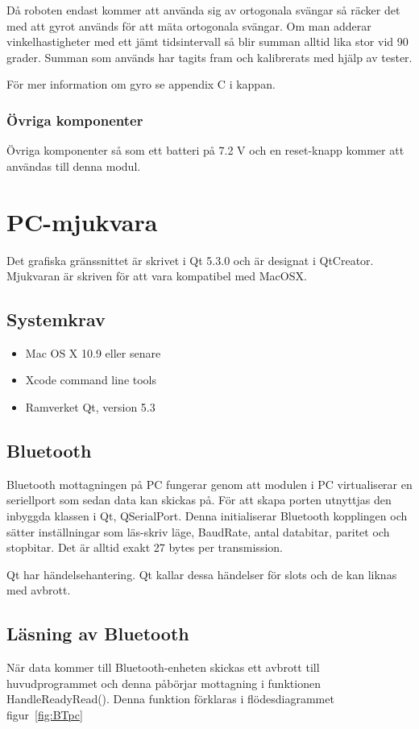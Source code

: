 \documentclass[a4paper,12pt,fleqn]{article}
\begin{document}
Då roboten endast kommer att använda sig av ortogonala svängar så räcker det med att gyrot används för att mäta ortogonala svängar. Om man adderar vinkelhastigheter med ett jämt tidsintervall så blir summan alltid lika stor vid 90 grader.
Summan som används har tagits fram och kalibrerats med hjälp av tester.

För mer information om gyro se appendix C i kappan.

\subsubsection{Övriga komponenter}
Övriga komponenter så som ett batteri på 7.2 V och en reset-knapp kommer att användas till denna modul.

\newpage
\section{PC-mjukvara}
Det grafiska gränssnittet är skrivet i Qt 5.3.0 och är designat i QtCreator. Mjukvaran är skriven för att vara kompatibel med MacOSX.

\subsection{Systemkrav}
\begin{itemize}
	\item Mac OS X 10.9 eller senare
	\item Xcode command line tools
	\item Ramverket Qt, version 5.3
\end{itemize}

\subsection{Bluetooth}
Bluetooth mottagningen på PC fungerar genom att modulen i PC virtualiserar en seriellport som sedan data kan skickas på. För att skapa porten utnyttjas den inbyggda klassen i Qt, QSerialPort. Denna initialiserar Bluetooth kopplingen och sätter inställningar som läs-skriv läge, BaudRate, antal databitar, paritet och stopbitar. Det är alltid exakt 27 bytes per transmission. 

Qt har händelsehantering. Qt kallar dessa händelser för slots och de kan liknas med avbrott.

\subsection{Läsning av Bluetooth}
När data kommer till Bluetooth-enheten skickas ett avbrott till huvudprogrammet och denna påbörjar mottagning i funktionen HandleReadyRead(). Denna funktion förklaras i flödesdiagrammet figur~\ref{fig:BTpc}
\end{document}
